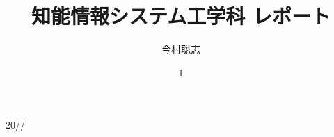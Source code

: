 \usepackage{tuatreporttitle}

\title{知能情報システム工学科 レポート}	%
\TUATtheme{} 		%
\author{今村聡志} 	%


\date1{20//} %




